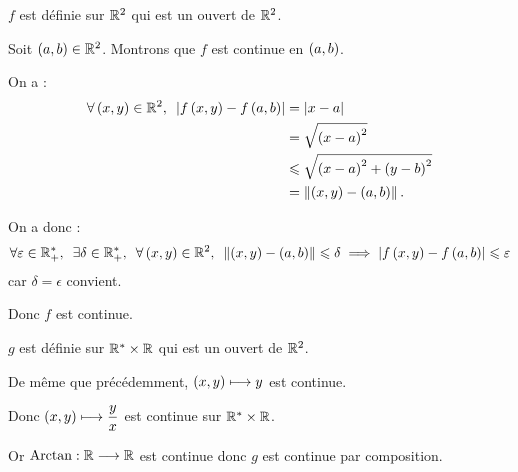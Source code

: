 \begin{corr}
\(f\) est définie sur \(\mathbb{R}^2\) qui est un ouvert de \(\mathbb{R}^2\).

Soit \(\left(a,b\right)\in\mathbb{R}^2\). Montrons que \(f\) est continue en \(\left(a,b\right)\).

On a : \[\begin{aligned}
\quantifs{\forall\paren{x,y}\in\R^2}\abs{f\paren{x,y}-f\paren{a,b}}&=\abs{x-a} \\
&=\sqrt{\paren{x-a}^2} \\
&\leq\sqrt{\paren{x-a}^2+\paren{y-b}^2} \\
&=\norme{\paren{x,y}-\paren{a,b}}.
\end{aligned}\]

On a donc : \[\quantifs{\forall\epsilon\in\Rps;\exists\delta\in\Rps;\forall\paren{x,y}\in\R^2}\norme{\paren{x,y}-\paren{a,b}}\leq\delta\imp\abs{f\paren{x,y}-f\paren{a,b}}\leq\epsilon\] car \(\delta=\epsilon\) convient.

Donc \(f\) est continue.

\(g\) est définie sur \(\mathbb{R}^*\times\mathbb{R}\) qui est un ouvert de \(\mathbb{R}^2\).

De même que précédemment, \(\left(x,y\right)\longmapsto y\) est continue.

Donc \(\left(x,y\right)\longmapsto\dfrac{y}{x}\) est continue sur \(\mathbb{R}^*\times\mathbb{R}\).

Or \(\operatorname{Arctan}:\mathbb{R}\longrightarrow\mathbb{R}\) est continue donc \(g\) est continue par composition.
\end{corr}